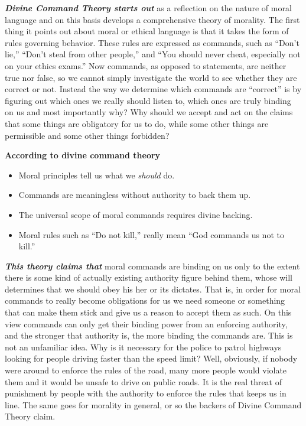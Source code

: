 \documentclass[
  12pt, openany]{book}
\makeatletter
\providecommand{\tightlist}{%
  \setlength{\itemsep}{0pt}\setlength{\parskip}{0pt}}
\newenvironment{kframe}{%
\medskip{}
\setlength{\fboxsep}{.8em}
 \def\at@end@of@kframe{}%
 \ifinner\ifhmode%
  \def\at@end@of@kframe{\end{minipage}}%
  \begin{minipage}{\columnwidth}%
 \fi\fi%
 \def\FrameCommand##1{\hskip\@totalleftmargin \hskip-\fboxsep
 \colorbox{shadecolor}{##1}\hskip-\fboxsep
     \hskip-\linewidth \hskip-\@totalleftmargin \hskip\columnwidth}%
 \MakeFramed {\advance\hsize-\width
   \@totalleftmargin\z@ \linewidth\hsize
   \@setminipage}}%
 {\par\unskip\endMakeFramed%
 \at@end@of@kframe}
\newenvironment{rmdblock}[1]
  {
  \begin{itemize}
  \renewcommand{\labelitemi}{
    \raisebox{-.7\height}[0pt][0pt]{
      {\setkeys{Gin}{width=3em,keepaspectratio}\texttt{[image: img/\#1]}}
    }
  }
  \setlength{\fboxsep}{1em}
  \begin{kframe}
  \item
  }
  {
  \end{kframe}
  \end{itemize}
  }
\newenvironment{note}
  {\begin{rmdblock}{note}}
  {\end{rmdblock}}
\theoremstyle{definition}
\theoremstyle{definition}
\theoremstyle{definition}
\theoremstyle{remark}
\makeatother
\begin{document}
\textbf{\emph{Divine Command Theory starts out}} as a reflection on the nature of moral language and on this basis develops a comprehensive theory of morality. The first thing it points out about moral or ethical language is that it takes the form of rules governing behavior. These rules are expressed as commands, such as ``Don't lie,'' ``Don't steal from other people,'' and ``You should never cheat, especially not on your ethics exams.'' Now commands, as opposed to statements, are neither true nor false, so we cannot simply investigate the world to see whether they are correct or not. Instead the way we determine which commands are ``correct'' is by figuring out which ones we really should listen to, which ones are truly binding on us and most importantly why? Why should we accept and act on the claims that some things are obligatory for us to do, while some other things are permissible and some other things forbidden?

\begin{note}

\textbf{According to divine command theory}

\begin{itemize}
\tightlist
\item
  Moral principles tell us what we \emph{should} do.
\item
  Commands are meaningless without authority to back them up.
\item
  The universal scope of moral commands requires divine backing.
\item
  Moral rules such as ``Do not kill,'' really mean ``God commands us not to kill.''
\end{itemize}

\end{note}

\textbf{\emph{This theory claims that}} moral commands are binding on us only to the extent there is some kind of actually existing authority figure behind them, whose will determines that we should obey his her or its dictates. That is, in order for moral commands to really become obligations for us we need someone or something that can make them stick and give us a reason to accept them as such. On this view commands can only get their binding power from an enforcing authority, and the stronger that authority is, the more binding the commands are. This is not an unfamiliar idea. Why is it necessary for the police to patrol highways looking for people driving faster than the speed limit? Well, obviously, if nobody were around to enforce the rules of the road, many more people would violate them and it would be unsafe to drive on public roads. It is the real threat of punishment by people with the authority to enforce the rules that keeps us in line. The same goes for morality in general, or so the backers of Divine Command Theory claim.
\end{document}
